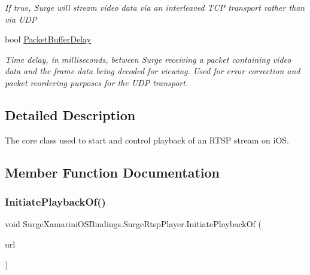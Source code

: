 \begin{DoxyCompactItemize}
\begin{DoxyCompactList}\small\item\em If true, Surge will stream video data via an interleaved T\+CP transport rather than via U\+DP \end{DoxyCompactList}\item 
bool \hyperlink{interface_surge_xamarini_o_s_bindings_1_1_surge_rtsp_player_a04d1e0594b8cd84a5b6a15c544568aee}{Packet\+Buffer\+Delay}
\begin{DoxyCompactList}\small\item\em Time delay, in milliseconds, between Surge receiving a packet containing video data and the frame data being decoded for viewing. Used for error correction and packet reordering purposes for the U\+DP transport. \end{DoxyCompactList}\end{DoxyCompactItemize}


\subsection{Detailed Description}
The core class used to start and control playback of an R\+T\+SP stream on i\+OS. 



\subsection{Member Function Documentation}
\mbox{\label{interface_surge_xamarini_o_s_bindings_1_1_surge_rtsp_player_a7c2572b559c1758415a21c0bde4417be}} 
\subsubsection{\texorpdfstring{Initiate\+Playback\+Of()}{InitiatePlaybackOf()}\hspace{0.1cm}{\footnotesize\ttfamily [1/3]}}
{\footnotesize\ttfamily void Surge\+Xamarini\+O\+S\+Bindings.\+Surge\+Rtsp\+Player.\+Initiate\+Playback\+Of (\begin{DoxyParamCaption}\item[{N\+S\+Url}]{url }\end{DoxyParamCaption})}



